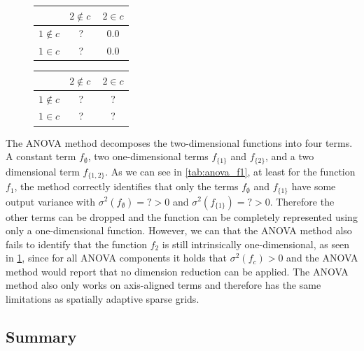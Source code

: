 \documentclass[
  a4paper,  %
  twoside,  %
  bibliography=totoc,
  headsepline,
  cleardoublepage=empty,
  parskip=half,
  draft=false
]{scrbook}
\begin{document}
\begin{mdframed}[style=style]
\begin{figure}[H]
        \centering
\begin{minipage}[H]{.45\textwidth}
  \centering
  \begin{tabular}{ l c c }
\hline \hline
& $2 \notin c~$ & $2 \in c$ \\
\hline
$1 \notin c$ & ? & 0.0\\
$1 \in c$ & ? & 0.0\\
\end{tabular}
\delimit
  \label{tab:anova_f1}
    \end{minipage}%
    \hspace{.05\textwidth}
    \begin{minipage}[H]{0.45\textwidth}
  \centering
  \begin{tabular}{ l c c }
\hline \hline
& $2 \notin c~$ & $2 \in c$ \\
\hline
$1 \notin c$ & ? & ?\\
$1 \in c$ & ? & ?\\
\end{tabular}
\delimit
  \label{tab:anova_f2}
    \end{minipage}
\end{figure}
\end{mdframed}
%
The ANOVA method decomposes the two-dimensional functions into four terms.
A constant term $f_\emptyset$, two one-dimensional terms $f_{\{1\}}$ and $f_{\{2\}}$, and a two dimensional term $f_{\{1,2\}}$.
As we can see in \cref{tab:anova_f1}, at least for the function $f_1$, the method correctly identifies that only the terms $f_\emptyset$ and $f_{\{1\}}$ have some output variance with $\sigma^2(f_\emptyset)=? > 0$ and $\sigma^2(f_{\{1\}})=? > 0$.
Therefore the other terms can be dropped and the function can be completely represented using only a one-dimensional function.
However, we can that the ANOVA method also fails to identify that the function $f_2$ is still intrinsically one-dimensional, as seen in \cref{tab:anova_f2}, since for all ANOVA components it holds that $\sigma^2(f_{c}) > 0$ and the ANOVA method would report that no dimension reduction can be applied.
The ANOVA method also only works on axis-aligned terms and therefore has the same limitations as spatially adaptive sparse grids.

\subsection{Summary}
\end{document}
